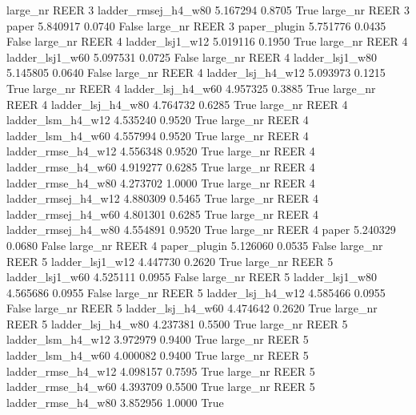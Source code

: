   large_nr     REER                 3 ladder_rmsej_h4_w80   5.167294      0.8705    True
  large_nr     REER                 3               paper   5.840917      0.0740   False
  large_nr     REER                 3        paper_plugin   5.751776      0.0435   False
  large_nr     REER                 4     ladder_lsj1_w12   5.019116      0.1950    True
  large_nr     REER                 4     ladder_lsj1_w60   5.097531      0.0725   False
  large_nr     REER                 4     ladder_lsj1_w80   5.145805      0.0640   False
  large_nr     REER                 4   ladder_lsj_h4_w12   5.093973      0.1215    True
  large_nr     REER                 4   ladder_lsj_h4_w60   4.957325      0.3885    True
  large_nr     REER                 4   ladder_lsj_h4_w80   4.764732      0.6285    True
  large_nr     REER                 4   ladder_lsm_h4_w12   4.535240      0.9520    True
  large_nr     REER                 4   ladder_lsm_h4_w60   4.557994      0.9520    True
  large_nr     REER                 4  ladder_rmse_h4_w12   4.556348      0.9520    True
  large_nr     REER                 4  ladder_rmse_h4_w60   4.919277      0.6285    True
  large_nr     REER                 4  ladder_rmse_h4_w80   4.273702      1.0000    True
  large_nr     REER                 4 ladder_rmsej_h4_w12   4.880309      0.5465    True
  large_nr     REER                 4 ladder_rmsej_h4_w60   4.801301      0.6285    True
  large_nr     REER                 4 ladder_rmsej_h4_w80   4.554891      0.9520    True
  large_nr     REER                 4               paper   5.240329      0.0680   False
  large_nr     REER                 4        paper_plugin   5.126060      0.0535   False
  large_nr     REER                 5     ladder_lsj1_w12   4.447730      0.2620    True
  large_nr     REER                 5     ladder_lsj1_w60   4.525111      0.0955   False
  large_nr     REER                 5     ladder_lsj1_w80   4.565686      0.0955   False
  large_nr     REER                 5   ladder_lsj_h4_w12   4.585466      0.0955   False
  large_nr     REER                 5   ladder_lsj_h4_w60   4.474642      0.2620    True
  large_nr     REER                 5   ladder_lsj_h4_w80   4.237381      0.5500    True
  large_nr     REER                 5   ladder_lsm_h4_w12   3.972979      0.9400    True
  large_nr     REER                 5   ladder_lsm_h4_w60   4.000082      0.9400    True
  large_nr     REER                 5  ladder_rmse_h4_w12   4.098157      0.7595    True
  large_nr     REER                 5  ladder_rmse_h4_w60   4.393709      0.5500    True
  large_nr     REER                 5  ladder_rmse_h4_w80   3.852956      1.0000    True
